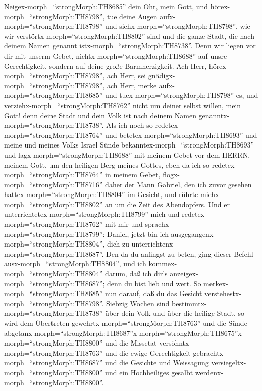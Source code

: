 Neigex-morph=``strongMorph:TH8685'' dein Ohr, mein Gott, und
hörex-morph=``strongMorph:TH8798'', tue deine Augen
aufx-morph=``strongMorph:TH8798'' und
siehx-morph=``strongMorph:TH8798'', wie wir
verstörtx-morph=``strongMorph:TH8802'' sind und die ganze Stadt, die
nach deinem Namen genannt istx-morph=``strongMorph:TH8738''. Denn wir
liegen vor dir mit unserm Gebet, nichtx-morph=``strongMorph:TH8688'' auf
unsre Gerechtigkeit, sondern auf deine große Barmherzigkeit.
 Ach Herr, hörex-morph=``strongMorph:TH8798'', ach Herr,
sei gnädigx-morph=``strongMorph:TH8798'', ach Herr, merke
aufx-morph=``strongMorph:TH8685'' und tuex-morph=``strongMorph:TH8798''
es, und verziehx-morph=``strongMorph:TH8762'' nicht um deiner selbst
willen, mein Gott! denn deine Stadt und dein Volk ist nach deinem Namen
genanntx-morph=``strongMorph:TH8738''.  Als ich noch so
redetex-morph=``strongMorph:TH8764'' und
betetex-morph=``strongMorph:TH8693'' und meine und meines Volks Israel
Sünde bekanntex-morph=``strongMorph:TH8693'' und
lagx-morph=``strongMorph:TH8688'' mit meinem Gebet vor dem HERRN, meinem
Gott, um den heiligen Berg meines Gottes,  eben da ich so
redetex-morph=``strongMorph:TH8764'' in meinem Gebet,
flogx-morph=``strongMorph:TH8716'' daher der Mann Gabriel, den ich zuvor
gesehen hattex-morph=``strongMorph:TH8804'' im Gesicht, und rührte
michx-morph=``strongMorph:TH8802'' an um die Zeit des Abendopfers.
 Und er unterrichtetex-morph=``strongMorph:TH8799'' mich
und redetex-morph=``strongMorph:TH8762'' mit mir und
sprachx-morph=``strongMorph:TH8799'': Daniel, jetzt bin ich
ausgegangenx-morph=``strongMorph:TH8804'', dich zu
unterrichtenx-morph=``strongMorph:TH8687''.  Den da du
anfingst zu beten, ging dieser Befehl ausx-morph=``strongMorph:TH8804'',
und ich kommex-morph=``strongMorph:TH8804'' darum, daß ich dir's
anzeigex-morph=``strongMorph:TH8687''; denn du bist lieb und wert. So
merkex-morph=``strongMorph:TH8685'' nun darauf, daß du das Gesicht
verstehestx-morph=``strongMorph:TH8798''.  Siebzig Wochen
sind bestimmtx-morph=``strongMorph:TH8738'' über dein Volk und über die
heilige Stadt, so wird dem Übertreten
gewehrtx-morph=``strongMorph:TH8763'' und die Sünde
abgetanx-morph=``strongMorph:TH8687''\textbar x-morph=``strongMorph:TH8675''x-morph=``strongMorph:TH8800''
und die Missetat versöhntx-morph=``strongMorph:TH8763'' und die ewige
Gerechtigkeit gebrachtx-morph=``strongMorph:TH8687'' und die Gesichte
und Weissagung versiegeltx-morph=``strongMorph:TH8800'' und ein
Hochheiliges gesalbt werdenx-morph=``strongMorph:TH8800''. 
